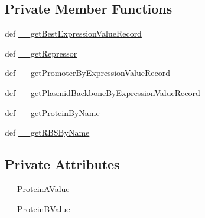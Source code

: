 \subsection*{Private Member Functions}
\begin{DoxyCompactItemize}
\item 
def \hyperlink{classweb_1_1modeling_1_1modeling_a7e21bc6c944c03003007f09be3d4c532}{\-\_\-\-\_\-get\-Best\-Expression\-Value\-Record}
\item 
def \hyperlink{classweb_1_1modeling_1_1modeling_ab56b48fabaaaa28f3e8553209fa79f37}{\-\_\-\-\_\-get\-Repressor}
\item 
def \hyperlink{classweb_1_1modeling_1_1modeling_a7f1813bef2dba930e11503d80088eec5}{\-\_\-\-\_\-get\-Promoter\-By\-Expression\-Value\-Record}
\item 
def \hyperlink{classweb_1_1modeling_1_1modeling_aafae6ae13a32e1c69f32185aa2d753d7}{\-\_\-\-\_\-get\-Plasmid\-Backbone\-By\-Expression\-Value\-Record}
\item 
def \hyperlink{classweb_1_1modeling_1_1modeling_a9f4b954963ce7048b87dd291cb96a478}{\-\_\-\-\_\-get\-Protein\-By\-Name}
\item 
def \hyperlink{classweb_1_1modeling_1_1modeling_ac58e01d50530a8d41869ce47815a482f}{\-\_\-\-\_\-get\-R\-B\-S\-By\-Name}
\end{DoxyCompactItemize}
\subsection*{Private Attributes}
\begin{DoxyCompactItemize}
\item 
\hyperlink{classweb_1_1modeling_1_1modeling_aaab2e25a40b5bc32b3f5a19e1c4874e5}{\-\_\-\-\_\-\-Protein\-A\-Value}
\item 
\hyperlink{classweb_1_1modeling_1_1modeling_a306954c5377672855d60164d1f668eda}{\-\_\-\-\_\-\-Protein\-B\-Value}
\end{DoxyCompactItemize}


